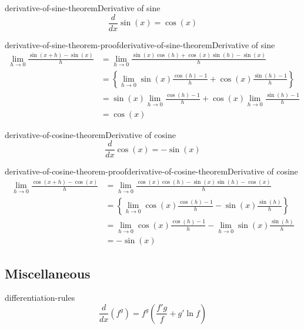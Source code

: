 \documentclass[preview]{standalone}
\begin{document}
\begin{snippettheorem}{derivative-of-sine-theorem}{Derivative of sine}
    \[
        \frac{d}{dx} \sin(x) = \cos(x)
    \]
\end{snippettheorem}

\begin{snippetproof}{derivative-of-sine-theorem-proof}{derivative-of-sine-theorem}{Derivative of sine}
    \begin{align*}
        \lim_{h\to 0} \frac{\sin(x+h) - \sin(x)}{h} &=
        \lim_{h\to 0} \frac{\sin(x)\cos(h) + \cos(x)\sin(h) - \sin(x)}{h} \\
        &= \left\{\lim_{h\to 0} \sin(x) \frac{\cos(h) - 1}{h} + \cos(x) \frac{\sin(h) - 1}{h}\right\} \\
        &= \sin(x) \lim_{h\to 0} \frac{\cos(h) - 1}{h} + \cos(x) \lim_{h\to 0} \frac{\sin(h) - 1}{h} \\
        &= \cos(x)
    \end{align*}
\end{snippetproof}

\begin{snippettheorem}{derivative-of-cosine-theorem}{Derivative of cosine}
    \[
        \frac{d}{dx} \cos(x) = -\sin(x)
    \]
\end{snippettheorem}

\begin{snippetproof}{derivative-of-cosine-theorem-proof}{derivative-of-cosine-theorem}{Derivative of cosine}
    \begin{align*}
        \lim_{h\to 0} \frac{\cos(x+h) - \cos(x)}{h} &=
        \lim_{h\to 0} \frac{\cos(x)\cos(h) - \sin(x)\sin(h) - \cos(x)}{h} \\
        &= \left\{\lim_{h\to 0} \cos(x) \frac{\cos(h) - 1}{h} - \sin(x) \frac{ \sin(h)}{h}\right\} \\
        &= \lim_{h\to 0} \cos(x) \frac{\cos(h) - 1}{h} - \lim_{h\to 0} \sin(x) \frac{ \sin(h)}{h} \\
        &= -\sin(x)
    \end{align*}
\end{snippetproof}

\subsection{Miscellaneous}

\begin{snippet}{differentiation-rules}
    \[
        \frac{d}{dx}(f^g)=f^g\left(\frac{f'g}{f}+g'\ln f\right)
    \]
\end{snippet}
\end{document}

